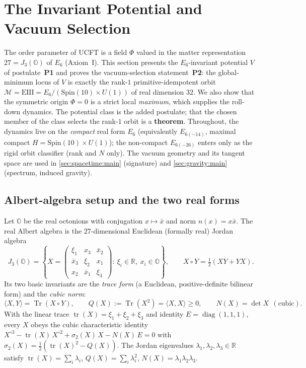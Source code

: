 \documentclass[11pt]{article}
\theoremstyle{plain}
\theoremstyle{definition}
\theoremstyle{remark}
\begin{document}
\section{The Invariant Potential and Vacuum Selection}
\label{sec:potential:main}
\label{sec:vacuum}

The order parameter of UCFT is a field $\Phi$ valued in the matter representation
$27=J_3(\mathbb O)$ of $E_6$ (Axiom~I). This section presents the $E_6$-invariant potential
$V$ of postulate~\textbf{P1} and proves the vacuum-selection statement~\textbf{P2}: the
global-minimum locus of $V$ is exactly the rank-$1$ primitive-idempotent orbit
$\mathcal M=\mathrm{EIII}=E_6/(\mathrm{Spin}(10)\times U(1))$ of real dimension $32$. We also
show that the symmetric origin $\Phi=0$ is a strict local \emph{maximum}, which supplies the
roll-down dynamics. The potential class is the added postulate; that the chosen member of the
class selects the rank-$1$ orbit is a \textbf{theorem}. Throughout, the dynamics live on the
\emph{compact} real form $E_6$ (equivalently $E_{6(-14)}$, maximal compact
$H=\mathrm{Spin}(10)\times U(1)$); the non-compact $E_{6(-26)}$ enters only as the rigid
orbit classifier (rank and $N$ only). The vacuum geometry and its tangent space are used in
\autoref{sec:spacetime:main} (signature) and \autoref{sec:gravity:main} (spectrum, induced
gravity).

\subsection{Albert-algebra setup and the two real forms}
\label{sec:potential:setup}

Let $\mathbb O$ be the real octonions with conjugation $x\mapsto\bar x$ and norm
$n(x)=x\bar x$. The real Albert algebra is the $27$-dimensional Euclidean (formally real)
Jordan algebra
\begin{equation}
\label{eq:potential:albert}
J_3(\mathbb O)=\left\{
X=\begin{pmatrix}\xi_1 & x_3 & \bar x_2\\ \bar x_3 & \xi_2 & x_1\\ x_2 & \bar x_1 & \xi_3\end{pmatrix}
:\ \xi_i\in\mathbb R,\ x_i\in\mathbb O\right\},
\qquad X\circ Y=\tfrac12(XY+YX).
\end{equation}
Its two basic invariants are the \emph{trace form} (a Euclidean, positive-definite bilinear
form) and the \emph{cubic norm}:
\begin{equation}
\label{eq:potential:invariants}
\langle X,Y\rangle=\operatorname{Tr}(X\circ Y),\qquad
Q(X):=\operatorname{Tr}(X^2)=\langle X,X\rangle\ge0,\qquad
N(X)=\det X\ \ (\text{cubic}).
\end{equation}
With the linear trace $\operatorname{tr}(X)=\xi_1+\xi_2+\xi_3$ and identity
$E=\operatorname{diag}(1,1,1)$, every $X$ obeys the cubic characteristic identity
$X^{\circ3}-\operatorname{tr}(X)\,X^{\circ2}+\sigma_2(X)\,X-N(X)\,E=0$ with
$\sigma_2(X)=\tfrac12(\operatorname{tr}(X)^2-Q(X))$. The Jordan eigenvalues
$\lambda_1,\lambda_2,\lambda_3\in\mathbb R$ satisfy
$\operatorname{tr}(X)=\sum_i\lambda_i$, $Q(X)=\sum_i\lambda_i^2$,
$N(X)=\lambda_1\lambda_2\lambda_3$.
\end{document}

